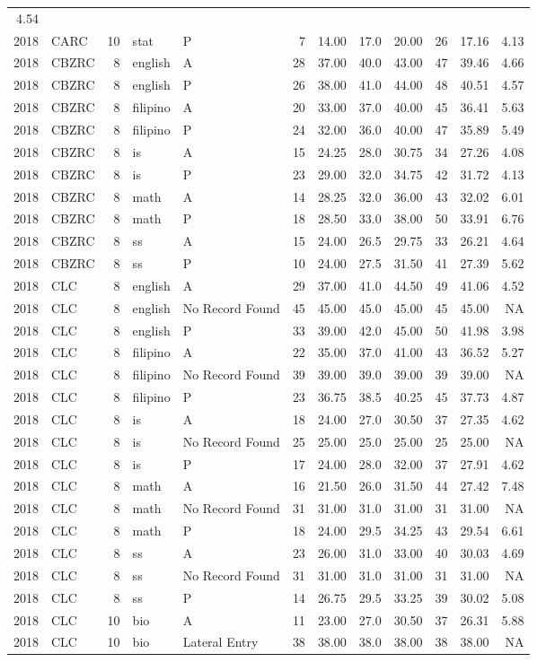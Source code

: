 \documentclass[]{article}
\begin{document}
\begin{longtable}[]{@{}rlrllrrrrrrr@{}}
4.54\tabularnewline
2018 & CARC & 10 & stat & P & 7 & 14.00 & 17.0 & 20.00 & 26 & 17.16 &
4.13\tabularnewline
2018 & CBZRC & 8 & english & A & 28 & 37.00 & 40.0 & 43.00 & 47 & 39.46
& 4.66\tabularnewline
2018 & CBZRC & 8 & english & P & 26 & 38.00 & 41.0 & 44.00 & 48 & 40.51
& 4.57\tabularnewline
2018 & CBZRC & 8 & filipino & A & 20 & 33.00 & 37.0 & 40.00 & 45 & 36.41
& 5.63\tabularnewline
2018 & CBZRC & 8 & filipino & P & 24 & 32.00 & 36.0 & 40.00 & 47 & 35.89
& 5.49\tabularnewline
2018 & CBZRC & 8 & is & A & 15 & 24.25 & 28.0 & 30.75 & 34 & 27.26 &
4.08\tabularnewline
2018 & CBZRC & 8 & is & P & 23 & 29.00 & 32.0 & 34.75 & 42 & 31.72 &
4.13\tabularnewline
2018 & CBZRC & 8 & math & A & 14 & 28.25 & 32.0 & 36.00 & 43 & 32.02 &
6.01\tabularnewline
2018 & CBZRC & 8 & math & P & 18 & 28.50 & 33.0 & 38.00 & 50 & 33.91 &
6.76\tabularnewline
2018 & CBZRC & 8 & ss & A & 15 & 24.00 & 26.5 & 29.75 & 33 & 26.21 &
4.64\tabularnewline
2018 & CBZRC & 8 & ss & P & 10 & 24.00 & 27.5 & 31.50 & 41 & 27.39 &
5.62\tabularnewline
2018 & CLC & 8 & english & A & 29 & 37.00 & 41.0 & 44.50 & 49 & 41.06 &
4.52\tabularnewline
2018 & CLC & 8 & english & No Record Found & 45 & 45.00 & 45.0 & 45.00 &
45 & 45.00 & NA\tabularnewline
2018 & CLC & 8 & english & P & 33 & 39.00 & 42.0 & 45.00 & 50 & 41.98 &
3.98\tabularnewline
2018 & CLC & 8 & filipino & A & 22 & 35.00 & 37.0 & 41.00 & 43 & 36.52 &
5.27\tabularnewline
2018 & CLC & 8 & filipino & No Record Found & 39 & 39.00 & 39.0 & 39.00
& 39 & 39.00 & NA\tabularnewline
2018 & CLC & 8 & filipino & P & 23 & 36.75 & 38.5 & 40.25 & 45 & 37.73 &
4.87\tabularnewline
2018 & CLC & 8 & is & A & 18 & 24.00 & 27.0 & 30.50 & 37 & 27.35 &
4.62\tabularnewline
2018 & CLC & 8 & is & No Record Found & 25 & 25.00 & 25.0 & 25.00 & 25 &
25.00 & NA\tabularnewline
2018 & CLC & 8 & is & P & 17 & 24.00 & 28.0 & 32.00 & 37 & 27.91 &
4.62\tabularnewline
2018 & CLC & 8 & math & A & 16 & 21.50 & 26.0 & 31.50 & 44 & 27.42 &
7.48\tabularnewline
2018 & CLC & 8 & math & No Record Found & 31 & 31.00 & 31.0 & 31.00 & 31
& 31.00 & NA\tabularnewline
2018 & CLC & 8 & math & P & 18 & 24.00 & 29.5 & 34.25 & 43 & 29.54 &
6.61\tabularnewline
2018 & CLC & 8 & ss & A & 23 & 26.00 & 31.0 & 33.00 & 40 & 30.03 &
4.69\tabularnewline
2018 & CLC & 8 & ss & No Record Found & 31 & 31.00 & 31.0 & 31.00 & 31 &
31.00 & NA\tabularnewline
2018 & CLC & 8 & ss & P & 14 & 26.75 & 29.5 & 33.25 & 39 & 30.02 &
5.08\tabularnewline
2018 & CLC & 10 & bio & A & 11 & 23.00 & 27.0 & 30.50 & 37 & 26.31 &
5.88\tabularnewline
2018 & CLC & 10 & bio & Lateral Entry & 38 & 38.00 & 38.0 & 38.00 & 38 &
38.00 & NA\tabularnewline

\end{longtable}
\end{document}

